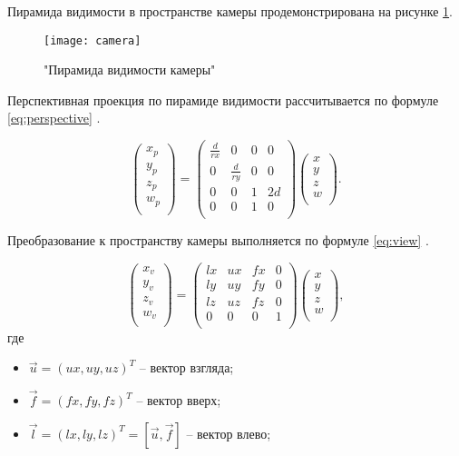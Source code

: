 Пирамида видимости в пространстве камеры продемонстрирована на рисунке \ref{fig:camera}.

\begin{figure}[H]
	\centering
	\texttt{[image: camera]}
	\caption{"Пирамида видимости камеры"}
	\label{fig:camera}
\end{figure}

Перспективная проекция по пирамиде видимости рассчитывается по формуле \ref{eq:perspective} \cite{projection}.

\begin{equation}
	\label{eq:perspective}
	\begin{pmatrix}
		x_p \\
		y_p \\
		z_p \\
		w_p \\
	\end{pmatrix} = 
	\begin{pmatrix}
		\frac{d}{rx}  & 0 & 0 & 0 \\
		0 & \frac{d}{ry} & 0 & 0 \\
		0 & 0 & 1 & 2d \\
		0 & 0 & 1 & 0 \\
	\end{pmatrix}
	\begin{pmatrix}
		x \\
		y \\
		z \\
		w \\
	\end{pmatrix}.
\end{equation}

Преобразование к пространству камеры выполняется по формуле \ref{eq:view} \cite{view}.

\begin{equation}
	\label{eq:view}
	\begin{pmatrix}
		x_v \\
		y_v \\
		z_v \\
		w_v \\
	\end{pmatrix} = 
	\begin{pmatrix}
		lx & ux & fx & 0 \\
		ly & uy & fy & 0 \\
		lz & uz & fz & 0 \\
		0 & 0 & 0 & 1 \\
	\end{pmatrix}
	\begin{pmatrix}
		x \\
		y \\
		z \\
		w \\
	\end{pmatrix},
\end{equation}
где
\begin{itemize}
	\item $\vec{u} = (ux, uy, uz)^T$ -- вектор взгляда;
	\item $\vec{f} = (fx, fy, fz)^T$ -- вектор вверх;
	\item $\vec{l} = (lx, ly, lz)^T = [\vec{u}, \vec{f}]$ -- вектор влево;
\end{itemize}

